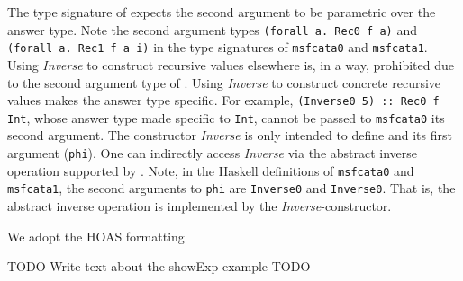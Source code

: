 The type signature of \msfit{} expects the second argument to be
parametric over the answer type. Note the second argument types
\lstinline{(forall a. Rec0 f a)} and \lstinline{(forall a. Rec1 f a i)}
in the type signatures of \lstinline{msfcata0} and \lstinline{msfcata1}. 
Using \textit{Inverse} to construct recursive values elsewhere is, in a way,
prohibited due to the second argument type of \msfit{}. Using \textit{Inverse}
to construct concrete recursive values makes the answer type specific.
For example, \lstinline{(Inverse0 5) :: Rec0 f Int}, whose answer type
made specific to \lstinline{Int}, cannot be passed to \lstinline{msfcata0}
its second argument. The constructor \textit{Inverse} is only intended to
define \msfit{} and its first argument (\lstinline{phi}). One can indirectly
access \textit{Inverse} via the abstract inverse operation supported by
\msfit{}. Note, in the Haskell definitions of \lstinline{msfcata0} and
\lstinline{msfcata1}, the second arguments to \lstinline{phi} are
\lstinline{Inverse0} and \lstinline{Inverse0}. That is, the abstract inverse
operation is implemented by the \textit{Inverse}-constructor.

We adopt the HOAS formatting
\begin{figure}

\vspace*{-3ex}
\end{figure}
TODO Write text about the showExp example TODO



